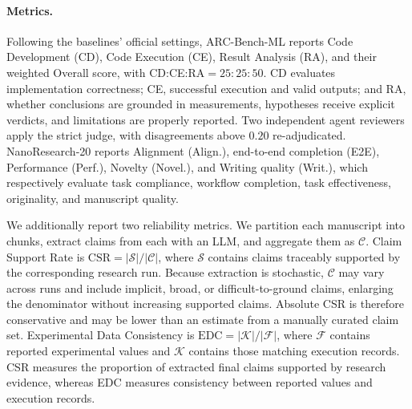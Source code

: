 \documentclass[letterpaper]{article} %
\begin{document}
\paragraph{Metrics.}
Following the baselines' official settings, ARC-Bench-ML reports Code Development (CD), Code Execution (CE), Result Analysis (RA), and their weighted Overall score, with CD:CE:RA$=25:25:50$. CD evaluates implementation correctness; CE, successful execution and valid outputs; and RA, whether conclusions are grounded in measurements, hypotheses receive explicit verdicts, and limitations are properly reported. Two independent agent reviewers apply the strict judge, with disagreements above $0.20$ re-adjudicated. NanoResearch-20 reports Alignment (Align.), end-to-end completion (E2E), Performance (Perf.), Novelty (Novel.), and Writing quality (Writ.), which respectively evaluate task compliance, workflow completion, task effectiveness, originality, and manuscript quality.

We additionally report two reliability metrics. We partition each manuscript into chunks, extract claims from each with an LLM, and aggregate them as $\mathcal{C}$. Claim Support Rate is $\mathrm{CSR}=|\mathcal{S}|/|\mathcal{C}|$, where $\mathcal{S}$ contains claims traceably supported by the corresponding research run. Because extraction is stochastic, $\mathcal{C}$ may vary across runs and include implicit, broad, or difficult-to-ground claims, enlarging the denominator without increasing supported claims. Absolute CSR is therefore conservative and may be lower than an estimate from a manually curated claim set. Experimental Data Consistency is $\mathrm{EDC}=|\mathcal{K}|/|\mathcal{F}|$, where $\mathcal{F}$ contains reported experimental values and $\mathcal{K}$ contains those matching execution records. CSR measures the proportion of extracted final claims supported by research evidence, whereas EDC measures consistency between reported values and execution records.
\end{document}
